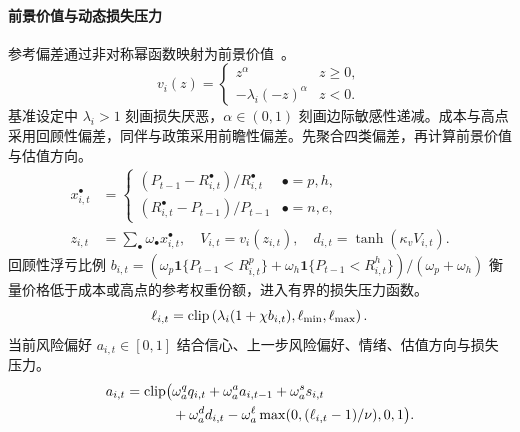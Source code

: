 \paragraph{前景价值与动态损失压力} 参考偏差通过非对称幂函数映射为前景价值~\cite{tversky1992advances}。
\begin{equation}
v_i(z)=\begin{cases}z^\alpha&z\ge0,\\-\lambda_i(-z)^\alpha&z<0.\end{cases}
  \label{eq:prospect_v_zh}
\end{equation}
基准设定中 $\lambda_i>1$ 刻画损失厌恶，$\alpha\in(0,1)$ 刻画边际敏感性递减。成本与高点采用回顾性偏差，同伴与政策采用前瞻性偏差。先聚合四类偏差，再计算前景价值与估值方向。
\begin{equation}
\begin{split}x^\bullet_{i,t}&=\begin{cases}(P_{t-1}-R^\bullet_{i,t})/R^\bullet_{i,t}&\bullet=p,h,\\(R^\bullet_{i,t}-P_{t-1})/P_{t-1}&\bullet=n,e,\end{cases}\\z_{i,t}&=\sum_\bullet\omega_\bullet x^\bullet_{i,t},\quad V_{i,t}=v_i(z_{i,t}),\quad d_{i,t}=\tanh(\kappa_vV_{i,t}).\end{split}
  \label{eq:aggregate_v_zh}
\end{equation}
回顾性浮亏比例 $b_{i,t}=(\omega_p\mathbf{1}\{P_{t-1}<R^p_{i,t}\}+\omega_h\mathbf{1}\{P_{t-1}<R^h_{i,t}\})/(\omega_p+\omega_h)$ 衡量价格低于成本或高点的参考权重份额，进入有界的损失压力函数。
\begin{equation}
  \ell_{i,t} = \operatorname{clip}\left( \lambda_i (1 + \chi b_{i,t}), \ell_{\min}, \ell_{\max} \right).
  \label{eq:loss_pressure_zh}
\end{equation}
当前风险偏好 $a_{i,t}\in[0,1]$ 结合信心、上一步风险偏好、情绪、估值方向与损失压力。
\begin{equation}
\begin{split}a_{i,t}=\operatorname{clip}\bigl(&\omega_a^q q_{i,t}+\omega_a^a a_{i,t-1}+\omega_a^s s_{i,t}\\&+\omega_a^d d_{i,t}-\omega_a^\ell\max(0,(\ell_{i,t}-1)/\nu),0,1\bigr).\end{split}
  \label{eq:risk_tolerance_zh}
\end{equation}

